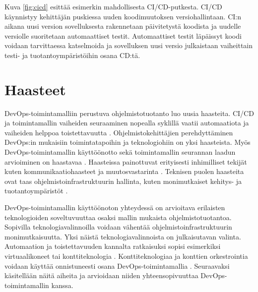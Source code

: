 Kuva \ref{fig:cicd} esittää esimerkin mahdollisesta CI/CD-putkesta. CI/CD käynnistyy kehittäjän puskiessa uuden koodimuutoksen versiohallintaan.
CI:n aikana uusi version sovelluksesta rakennetaan päivitetystä koodista ja uudelle versiolle suoritetaan automaattiset testit.
Automaattiset testit läpäissyt koodi voidaan tarvittaessa katselmoida ja sovelluksen uusi versio julkaistaan vaiheittain testi- ja tuotantoympäristöihin osana CD:tä.

\section{Haasteet}

DevOps-toimintamalliin perustuva ohjelmistotuotanto luo uusia haasteita.
CI/CD ja toimintamallin vaiheiden seuraaminen nopealla syklillä vaatii automaatiota ja vaiheiden helppoa toistettavuutta \cite{Jabbari16, Leite19}.
Ohjelmistokehittäjien perehdyttäminen DevOps:in mukaisiin toimintatapoihin ja teknologiohiin on yksi haasteista.
Myös DevOps-toimintamallin käyttöönotto sekä toimintamallin seurannan laadun arvioiminen on haastavaa \cite{Leite19}.
Haasteissa painottuvat erityisesti inhimilliset tekijät kuten kommunikaatiohaasteet ja muutosvastarinta \cite{Kalliosaari16}.
Teknisen puolen haasteita ovat taas ohjelmistoinfrastruktuurin hallinta, kuten monimutkaiset kehitys- ja tuotantoympäristöt \cite{Khan22, Kalliosaari16}.

DevOps-toimintamallin käyttöönoton yhteydessä on arvioitava erilaisten teknologioiden soveltuvuuttaa osaksi mallin mukaista ohjelmistotuotantoa.
Sopivilla teknologiavalinnoilla voidaan vähentää ohjelmistoinfrastruktuurin monimutkaisuutta.
Yksi näistä teknologiavalinnoista on julkaisutavan valinta.
Automaation ja toistettavuuden kannalta ratkaisuksi sopisi esimerkiksi virtuaalikoneet tai konttiteknologia \cite{Dua14}.
Konttiteknologiaa ja konttien orkestrointia voidaan käyttää onnistuneesti osana DevOps-toimintamallia \cite{Kang16, Narasimhulu23}.
Seuraavaksi käsitellään näitä aiheita ja arvioidaan niiden yhteensopivuuttaa DevOps-toimintamallin kanssa.

